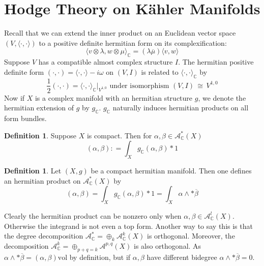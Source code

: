 \documentclass[12pt]{article}
\theoremstyle{plain}
\theoremstyle{definition}
\newtheorem{definition}[equation]{Definition}
\newcommand{\IC}{\mathbb{C}}
\newcommand\iso{\,{\cong}\,}
\newcommand\tensor{{\otimes}}
\newcommand{\<}{\langle}
\renewcommand{\>}{\rangle}
\newcommand{\w}{\omega}
\newcommand{\vol}{\mathrm{vol}}
\newcommand{\sA}{\mathcal{A}}
\begin{document}
\section{Hodge Theory on K{\"a}hler Manifolds}
Recall that we can extend the inner product on an Euclidean vector space $(V, \< \cdot, \cdot \>)$ to a positive definite hermitian form on its complexification:
$$ \< v \tensor \lambda, w \tensor \mu \>_\IC = (\lambda \overline{\mu}) \< v, w \> $$ 
Suppose $V$ has a compatible almost complex structure $I$. The hermitian positive definite form $(\cdot, \cdot) = \< \cdot, \cdot \> - i \w$ on $(V, I)$ is related to $\< \cdot, \cdot \>_\IC$ by 
$$ \frac{1}{2}(\cdot, \cdot) = \< \cdot, \cdot \>_\IC|_{V^{1, 0}} \text{ under isomorphism } (V, I) \iso V^{1, 0} $$
Now if $X$ is a complex manifold with an hermitian structure $g$, we denote the hermitian extension of $g$ by $g_\IC$. $g_\IC$ naturally induces hermitian products on all form bundles. 

\begin{definition}
Suppose $X$ is compact. Then for $\alpha, \beta \in \sA^*_\IC(X)$
$$ (\alpha, \beta) : = \int_X g_\IC(\alpha, \beta) * 1 $$ 
\end{definition}

\begin{definition}
Let $(X, g)$ be a compact hermitian manifold. Then one defines an hermitian product on $\sA^*_\IC(X)$ by 
$$ (\alpha, \beta) = \int_X g_\IC(\alpha, \beta) * 1 = \int_X \alpha \wedge * \overline{\beta} $$
\end{definition}
Clearly the hermitian product can be nonzero only when $\alpha, \beta \in \sA^l_\IC(X)$. Otherwise the integrand is not even a top form. Another way to say this is that the degree decomposition $\sA_\IC^* = \oplus_k \sA^k_\IC(X)$ is orthogonal. Moreover, the decomposition $\sA_\IC^k = \oplus_{p + q = k} \sA^{p, q}(X)$ is also orthogonal. As $\alpha \wedge * \overline{\beta} = (\alpha, \beta) \vol$ by definition, but if $\alpha, \beta$ have different bidegree $\alpha \wedge *\overline{\beta} = 0$. 
\end{document}
